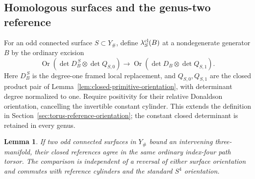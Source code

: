 \documentclass[11pt]{amsart}
\newtheorem{lemma}[theorem]{Lemma}
\theoremstyle{definition}
\theoremstyle{remark}
\theoremstyle{plain}
\begin{document}
\subsection{Homologous surfaces and the genus-two reference}
\label{sec:homologous-surface-reference}

For an odd connected surface $S\subset Y_\#$, define
$\lambda_S^{\rm cl}(B)$ at a nondegenerate generator $B$
by the ordinary excision
\begin{equation}\label{eq:ordinary-surface-reference}
 \operatorname{Or}(\det D_B^{\,S}\otimes\det Q_{S,0})
      \longrightarrow
 \operatorname{Or}(\det D_B\otimes\det Q_{S,1}).
\end{equation}
Here $D_B^{\,S}$ is the degree-one framed local replacement,
and $Q_{S,0},Q_{S,1}$ are the closed product pair of
Lemma~\ref{lem:closed-primitive-orientation}, with determinant
degree normalized to one. Require positivity for their
relative Donaldson orientation, cancelling the invertible
constant cylinder. This extends the definition in
Section~\ref{sec:torus-reference-orientation}; the constant
closed determinant is retained in every genus.

\begin{lemma}\label{lem:homologous-surface-reference}
If two odd connected surfaces in $Y_\#$ bound an
intervening three-manifold, their closed references agree
in the same ordinary index-four path torsor. The comparison
is independent of a reversal of either surface orientation
and commutes with reference cylinders and the standard
$S^4$ orientation.
\end{lemma}
\end{document}
